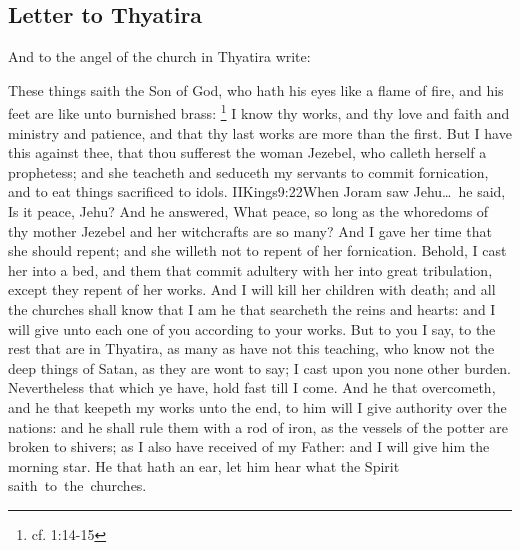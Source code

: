 \subsection*{Letter to Thyatira}
And to the angel of the church in Thyatira write:

These things saith the Son of God, who hath his eyes like a flame of fire, and his feet are like unto burnished brass:%
	\footnote{cf. 1:14-15} %
I know thy works, and thy love and faith and ministry and patience, and that thy last works are more than the first. %
But I have this against thee, that thou sufferest the woman Jezebel, who calleth herself a prophetess; and she teacheth and seduceth my servants to commit fornication, and to eat things sacrificed to idols.%
				 {IIKings}{9:22}{When Joram saw Jehu\ldots\ he said, Is it peace, Jehu? And he answered, What peace, so long as the whoredoms of thy mother Jezebel and her witchcrafts are so many?} %
And I gave her time that she should repent; and she willeth not to repent of her fornication. %
Behold, I cast her into a bed, and them that commit adultery with her into great tribulation, except they repent of her works. %
And I will kill her children with death; and all the churches shall know that I am he that searcheth the reins and hearts:%
and I will give unto each one of you according to your works. %
But to you I say, to the rest that are in Thyatira, as many as have not this teaching, who know not the deep things of Satan, as they are wont to say; I cast upon you none other burden. %
Nevertheless that which ye have, hold fast till I come. %
And he that overcometh, and he that keepeth my works unto the end, to him will I give authority over the nations: %
and he shall rule them with a rod of iron, as the vessels of the potter are broken to shivers;%
as I also have received of my Father: %
and I will give him the morning star. %
He that hath an ear, let him hear what the Spirit saith~to~the~churches.

